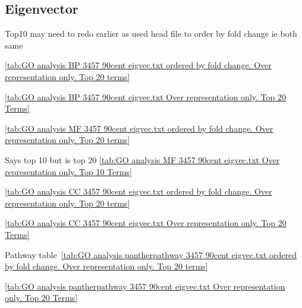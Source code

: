 \subsection{Eigenvector}

Top10 may need to redo earlier as used head file to order by fold change ie both same

\ref{tab:GO analysis BP 3457 90cent eigvec.txt ordered by fold change. Over representation only. Top 20 terms}

\ref{tab:GO analysis BP 3457 90cent eigvec.txt Over representation only. Top 20 Terms}

\ref{tab:GO analysis MF 3457 90cent eigvec.txt ordered by fold change. Over representation only. Top 20 terms}

Says top 10 but is top 20 \ref{tab:GO analysis MF 3457 90cent eigvec.txt Over representation only. Top 10 Terms}

\ref{tab:GO analysis CC 3457 90cent eigvec.txt ordered by fold change. Over representation only. Top 20 terms}

\ref{tab:GO analysis CC 3457 90cent eigvec.txt Over representation only. Top 20 Terms}

Pathway table~\ref{tab:GO analysis pantherpathway 3457 90cent eigvec.txt ordered by fold change. Over representation only. Top 20 terms}

\ref{tab:GO analysis pantherpathway 3457 90cent eigvec.txt Over representation only. Top 20 Terms}


